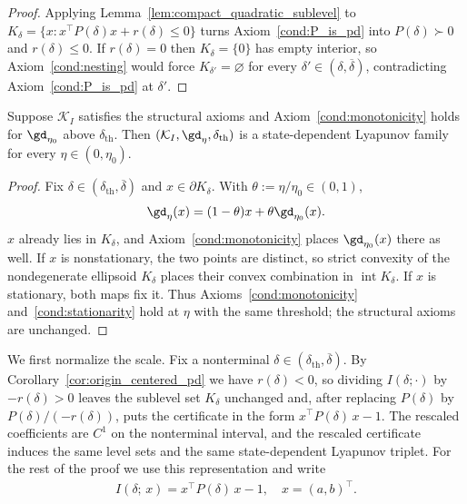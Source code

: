 \documentclass{article}
\begin{document}
\begin{proof}
Applying Lemma~\ref{lem:compact_quadratic_sublevel} to
$K_\delta=\{x:x^\top P(\delta)x+r(\delta)\le0\}$ turns
Axiom~\ref{cond:P_is_pd} into $P(\delta)\succ0$ and $r(\delta)\le0$. If
$r(\delta)=0$ then $K_\delta=\{0\}$ has empty interior, so
Axiom~\ref{cond:nesting} would force $K_{\delta'}=\varnothing$ for every
$\delta'\in(\delta,\overline\delta)$, contradicting
Axiom~\ref{cond:P_is_pd} at $\delta'$.
\end{proof}

\begin{lemma}
\label{lem:step_size_downgrade}
Suppose $\mathcal K_I$ satisfies the structural axioms and
Axiom~\ref{cond:monotonicity} holds for $\gd_{\eta_0}$ above
$\delta_{\mathrm{th}}$. Then
$(\mathcal K_I,\gd_\eta,\delta_{\mathrm{th}})$ is a state-dependent
Lyapunov family for every $\eta\in(0,\eta_0)$.
\end{lemma}

\begin{proof}
Fix $\delta\in(\delta_{\mathrm{th}},\overline\delta)$ and
$x\in\partial K_\delta$. With $\theta:=\eta/\eta_0\in(0,1)$,
\begin{align}
    \gd_\eta(x)=(1-\theta)x+\theta\gd_{\eta_0}(x).
\end{align}
$x$ already lies in $K_\delta$, and Axiom~\ref{cond:monotonicity} places
$\gd_{\eta_0}(x)$ there as well. If $x$ is nonstationary, the two points are
distinct, so strict convexity of the nondegenerate ellipsoid $K_\delta$ places
their convex combination in
$\operatorname{int}K_\delta$. If $x$ is stationary, both maps fix it. Thus
Axioms~\ref{cond:monotonicity} and~\ref{cond:stationarity} hold at $\eta$ with
the same threshold; the structural axioms are unchanged.
\end{proof}

We first normalize the scale. Fix a nonterminal
$\delta\in(\delta_{\mathrm{th}},\overline\delta)$. By
Corollary~\ref{cor:origin_centered_pd} we have $r(\delta)<0$, so dividing
$I(\delta;\cdot)$ by $-r(\delta)>0$ leaves the sublevel set $K_\delta$
unchanged and, after replacing $P(\delta)$ by $P(\delta)/(-r(\delta))$, puts
the certificate in the form $x^\top P(\delta)\,x-1$. The rescaled coefficients
are $C^1$ on the nonterminal interval, and the rescaled certificate induces
the same level sets and the same state-dependent Lyapunov triplet. For the
rest of the proof we use this representation and write
\begin{align}
    I(\delta;\, x) = x^\top P(\delta)\, x - 1,
    \quad
    x = (a, b)^\top.
\end{align}
\end{document}

